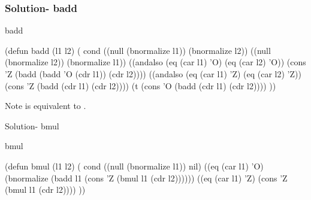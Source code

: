 \documentclass[fleqn]{beamer}
\begin{document}
\begin{frame}[fragile]
\frametitle{Solution- badd}
\begin{block}{badd}
  \begin{LISP}
(defun badd (l1 l2) (
  cond
    ((null (bnormalize l1)) (bnormalize l2))
    ((null (bnormalize l2)) (bnormalize l1))
    ((andalso (eq (car l1) 'O) (eq (car l2) 'O))
      (cons 'Z (badd (badd 'O (cdr l1)) (cdr l2))))
    ((andalso (eq (car l1) 'Z) (eq (car l2) 'Z))
      (cons 'Z (badd (cdr l1) (cdr l2))))
    (t (cons 'O (badd (cdr l1) (cdr l2))))
))
    \end{LISP}
\end{block}

\begin{block}{Note}
   is equivalent to .
\end{block}
\end{frame}


\begin{frame}[fragile]{Solution- bmul}
\begin{block}{bmul}
  \begin{LISP}
(defun bmul (l1 l2) (
  cond
    ((null (bnormalize l1)) nil)
    ((eq (car l1) 'O)
      (bnormalize
        (badd l1 (cons 'Z (bmul l1 (cdr l2))))))
    ((eq (car l1) 'Z) (cons 'Z (bmul l1 (cdr l2))))
))
    \end{LISP}
\end{block}
\end{frame}
\end{document}
